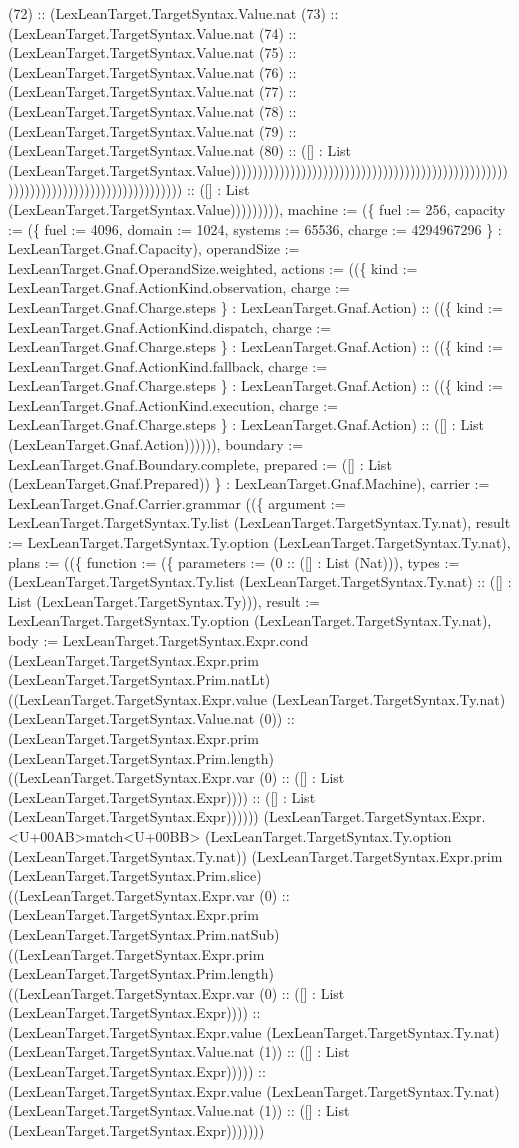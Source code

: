 \documentclass[11pt]{article}
\begin{document}
(72) :: (LexLeanTarget.TargetSyntax.Value.nat (73) :: (LexLeanTarget.TargetSyntax.Value.nat (74) :: (LexLeanTarget.TargetSyntax.Value.nat (75) :: (LexLeanTarget.TargetSyntax.Value.nat (76) :: (LexLeanTarget.TargetSyntax.Value.nat (77) :: (LexLeanTarget.TargetSyntax.Value.nat (78) :: (LexLeanTarget.TargetSyntax.Value.nat (79) :: (LexLeanTarget.TargetSyntax.Value.nat (80) :: ([] : List (LexLeanTarget.TargetSyntax.Value))))))))))))))))))))))))))))))))))))))))))))))))))))))))))))))))))))))))))))))))))) :: ([] : List (LexLeanTarget.TargetSyntax.Value))))))))), machine := (\{ fuel := 256, capacity := (\{ fuel := 4096, domain := 1024, systems := 65536, charge := 4294967296 \} : LexLeanTarget.Gnaf.Capacity), operandSize := LexLeanTarget.Gnaf.OperandSize.weighted, actions := ((\{ kind := LexLeanTarget.Gnaf.ActionKind.observation, charge := LexLeanTarget.Gnaf.Charge.steps \} : LexLeanTarget.Gnaf.Action) :: ((\{ kind := LexLeanTarget.Gnaf.ActionKind.dispatch, charge := LexLeanTarget.Gnaf.Charge.steps \} : LexLeanTarget.Gnaf.Action) :: ((\{ kind := LexLeanTarget.Gnaf.ActionKind.fallback, charge := LexLeanTarget.Gnaf.Charge.steps \} : LexLeanTarget.Gnaf.Action) :: ((\{ kind := LexLeanTarget.Gnaf.ActionKind.execution, charge := LexLeanTarget.Gnaf.Charge.steps \} : LexLeanTarget.Gnaf.Action) :: ([] : List (LexLeanTarget.Gnaf.Action)))))), boundary := LexLeanTarget.Gnaf.Boundary.complete, prepared := ([] : List (LexLeanTarget.Gnaf.Prepared)) \} : LexLeanTarget.Gnaf.Machine), carrier := LexLeanTarget.Gnaf.Carrier.grammar ((\{ argument := LexLeanTarget.TargetSyntax.Ty.list (LexLeanTarget.TargetSyntax.Ty.nat), result := LexLeanTarget.TargetSyntax.Ty.option (LexLeanTarget.TargetSyntax.Ty.nat), plans := ((\{ function := (\{ parameters := (0 :: ([] : List (Nat))), types := (LexLeanTarget.TargetSyntax.Ty.list (LexLeanTarget.TargetSyntax.Ty.nat) :: ([] : List (LexLeanTarget.TargetSyntax.Ty))), result := LexLeanTarget.TargetSyntax.Ty.option (LexLeanTarget.TargetSyntax.Ty.nat), body := LexLeanTarget.TargetSyntax.Expr.cond (LexLeanTarget.TargetSyntax.Expr.prim (LexLeanTarget.TargetSyntax.Prim.natLt) ((LexLeanTarget.TargetSyntax.Expr.value (LexLeanTarget.TargetSyntax.Ty.nat) (LexLeanTarget.TargetSyntax.Value.nat (0)) :: (LexLeanTarget.TargetSyntax.Expr.prim (LexLeanTarget.TargetSyntax.Prim.length) ((LexLeanTarget.TargetSyntax.Expr.var (0) :: ([] : List (LexLeanTarget.TargetSyntax.Expr)))) :: ([] : List (LexLeanTarget.TargetSyntax.Expr)))))) (LexLeanTarget.TargetSyntax.Expr.<U+00AB>match<U+00BB> (LexLeanTarget.TargetSyntax.Ty.option (LexLeanTarget.TargetSyntax.Ty.nat)) (LexLeanTarget.TargetSyntax.Expr.prim (LexLeanTarget.TargetSyntax.Prim.slice) ((LexLeanTarget.TargetSyntax.Expr.var (0) :: (LexLeanTarget.TargetSyntax.Expr.prim (LexLeanTarget.TargetSyntax.Prim.natSub) ((LexLeanTarget.TargetSyntax.Expr.prim (LexLeanTarget.TargetSyntax.Prim.length) ((LexLeanTarget.TargetSyntax.Expr.var (0) :: ([] : List (LexLeanTarget.TargetSyntax.Expr)))) :: (LexLeanTarget.TargetSyntax.Expr.value (LexLeanTarget.TargetSyntax.Ty.nat) (LexLeanTarget.TargetSyntax.Value.nat (1)) :: ([] : List (LexLeanTarget.TargetSyntax.Expr))))) :: (LexLeanTarget.TargetSyntax.Expr.value (LexLeanTarget.TargetSyntax.Ty.nat) (LexLeanTarget.TargetSyntax.Value.nat (1)) :: ([] : List (LexLeanTarget.TargetSyntax.Expr))))))) 
\end{document}
